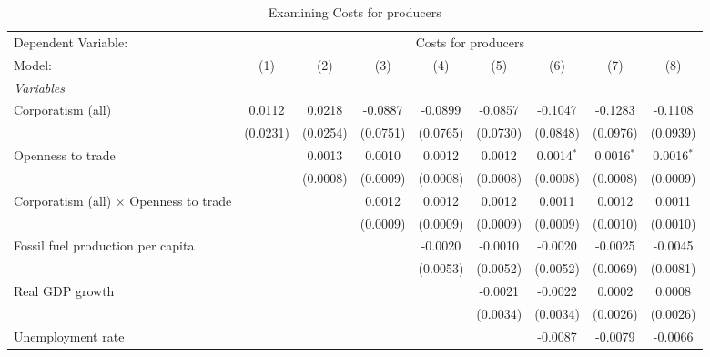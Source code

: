 
\begin{table}[htbp]
   \caption{Examining Costs for producers}
   \centering
   \begin{tabular}{lcccccccc}
      \tabularnewline \midrule \midrule
      Dependent Variable: & \multicolumn{8}{c}{Costs for producers}\\
      Model:                                        & (1)      & (2)      & (3)      & (4)      & (5)      & (6)          & (7)          & (8)\\  
      \midrule
      \emph{Variables}\\
      Corporatism (all)                             & 0.0112   & 0.0218   & -0.0887  & -0.0899  & -0.0857  & -0.1047      & -0.1283      & -0.1108\\   
                                                    & (0.0231) & (0.0254) & (0.0751) & (0.0765) & (0.0730) & (0.0848)     & (0.0976)     & (0.0939)\\   
      Openness to trade                             &          & 0.0013   & 0.0010   & 0.0012   & 0.0012   & 0.0014$^{*}$ & 0.0016$^{*}$ & 0.0016$^{*}$\\   
                                                    &          & (0.0008) & (0.0009) & (0.0008) & (0.0008) & (0.0008)     & (0.0008)     & (0.0009)\\   
      Corporatism (all) $\times$ Openness to trade  &          &          & 0.0012   & 0.0012   & 0.0012   & 0.0011       & 0.0012       & 0.0011\\   
                                                    &          &          & (0.0009) & (0.0009) & (0.0009) & (0.0009)     & (0.0010)     & (0.0010)\\   
      Fossil fuel production per capita             &          &          &          & -0.0020  & -0.0010  & -0.0020      & -0.0025      & -0.0045\\   
                                                    &          &          &          & (0.0053) & (0.0052) & (0.0052)     & (0.0069)     & (0.0081)\\   
      Real GDP growth                               &          &          &          &          & -0.0021  & -0.0022      & 0.0002       & 0.0008\\   
                                                    &          &          &          &          & (0.0034) & (0.0034)     & (0.0026)     & (0.0026)\\   
      Unemployment rate                             &          &          &          &          &          & -0.0087      & -0.0079      & -0.0066\\   

\end{tabular}
\end{table}
